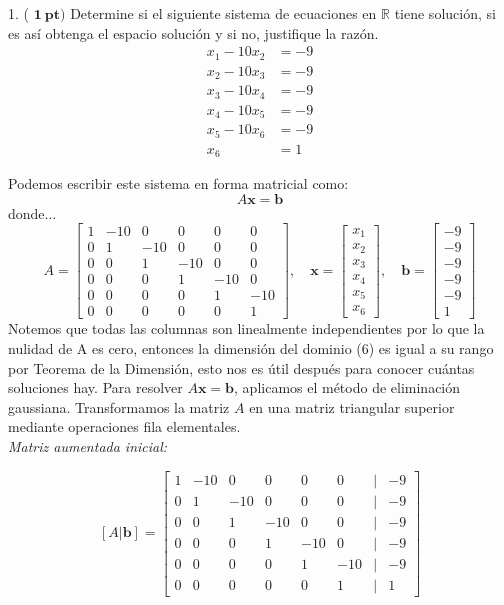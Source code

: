 1. ( \( \mathbf{1} \mathbf{~ p t}) \) Determine si el siguiente sistema de ecuaciones en \( \mathbb{R} \) tiene solución, si es así obtenga el espacio solución y si no, justifique la razón.
\[
\begin{aligned}
x_{1}-10 x_{2} & =-9 \\
x_{2}-10 x_{3} & =-9 \\
x_{3}-10 x_{4} & =-9 \\
x_{4}-10 x_{5} & =-9 \\
x_{5}-10 x_{6} & =-9 \\
x_{6} & =1
\end{aligned}
\]
\begin{solution}
Podemos escribir este sistema en forma matricial como:
\[
A \mathbf{x} = \mathbf{b}
\]
donde...
\[
A = \begin{bmatrix}
1 & -10 & 0 & 0 & 0 & 0 \\
0 & 1 & -10 & 0 & 0 & 0 \\
0 & 0 & 1 & -10 & 0 & 0 \\
0 & 0 & 0 & 1 & -10 & 0 \\
0 & 0 & 0 & 0 & 1 & -10 \\
0 & 0 & 0 & 0 & 0 & 1
\end{bmatrix}, \quad
\mathbf{x} = \begin{bmatrix}
x_{1} \\
x_{2} \\
x_{3} \\
x_{4} \\
x_{5} \\
x_{6}
\end{bmatrix}, \quad
\mathbf{b} = \begin{bmatrix}
-9 \\
-9 \\
-9 \\
-9 \\
-9 \\
1
\end{bmatrix}
\]
Notemos que todas las columnas son linealmente independientes por lo que la nulidad de A es cero, entonces la dimensión del dominio (6) es igual a su rango por Teorema de la Dimensión, esto nos es útil después para conocer cuántas soluciones hay. Para resolver \( A \mathbf{x} = \mathbf{b} \), aplicamos el método de eliminación gaussiana. Transformamos la matriz \( A \) en una matriz triangular superior mediante operaciones fila elementales. \\
\textit{Matriz aumentada inicial:}

\[
[A | \mathbf{b}] = \begin{bmatrix}
1 & -10 & 0 & 0 & 0 & 0 & \mid & -9 \\
0 & 1 & -10 & 0 & 0 & 0 & \mid & -9 \\
0 & 0 & 1 & -10 & 0 & 0 & \mid & -9 \\
0 & 0 & 0 & 1 & -10 & 0 & \mid & -9 \\
0 & 0 & 0 & 0 & 1 & -10 & \mid & -9 \\
0 & 0 & 0 & 0 & 0 & 1 & \mid & 1
\end{bmatrix}
\]


\end{solution}
